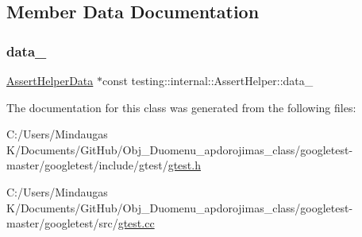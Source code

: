 \subsection{Member Data Documentation}
\mbox{\label{classtesting_1_1internal_1_1_assert_helper_aa6a32ec28727fdf56d95c38f739b2254}} 
\subsubsection{\texorpdfstring{data\_}{data\_}}
{\footnotesize\ttfamily \mbox{\hyperlink{structtesting_1_1internal_1_1_assert_helper_1_1_assert_helper_data}{Assert\+Helper\+Data}} $\ast$const testing\+::internal\+::\+Assert\+Helper\+::data\+\_\+\hspace{0.3cm}{\ttfamily [private]}}



The documentation for this class was generated from the following files\+:\begin{DoxyCompactItemize}
\item 
C\+:/\+Users/\+Mindaugas K/\+Documents/\+Git\+Hub/\+Obj\+\_\+\+Duomenu\+\_\+apdorojimas\+\_\+class/googletest-\/master/googletest/include/gtest/\mbox{\hyperlink{googletest-master_2googletest_2include_2gtest_2gtest_8h}{gtest.\+h}}\item 
C\+:/\+Users/\+Mindaugas K/\+Documents/\+Git\+Hub/\+Obj\+\_\+\+Duomenu\+\_\+apdorojimas\+\_\+class/googletest-\/master/googletest/src/\mbox{\hyperlink{googletest-master_2googletest_2src_2gtest_8cc}{gtest.\+cc}}\end{DoxyCompactItemize}
